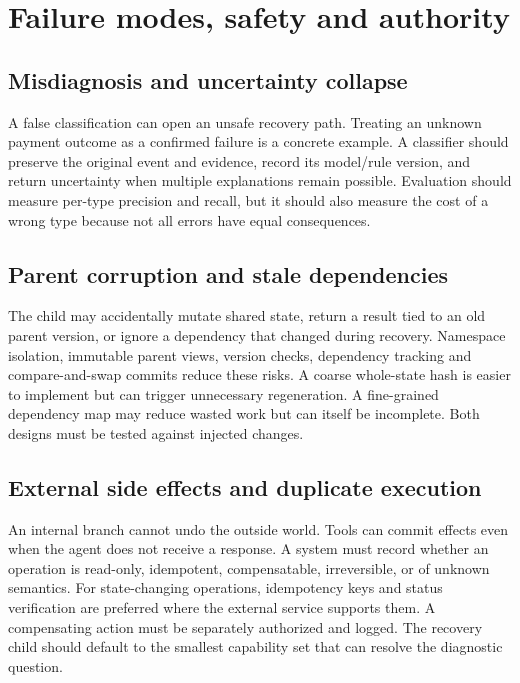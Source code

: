 \section{Failure modes, safety and authority}
\label{sec:ch13-safety}

\subsection{Misdiagnosis and uncertainty collapse}

A false classification can open an unsafe recovery path. Treating an unknown payment outcome as a confirmed failure is a concrete example. A classifier should preserve the original event and evidence, record its model/rule version, and return uncertainty when multiple explanations remain possible. Evaluation should measure per-type precision and recall, but it should also measure the cost of a wrong type because not all errors have equal consequences.

\subsection{Parent corruption and stale dependencies}

The child may accidentally mutate shared state, return a result tied to an old parent version, or ignore a dependency that changed during recovery. Namespace isolation, immutable parent views, version checks, dependency tracking and compare-and-swap commits reduce these risks. A coarse whole-state hash is easier to implement but can trigger unnecessary regeneration. A fine-grained dependency map may reduce wasted work but can itself be incomplete. Both designs must be tested against injected changes.

\subsection{External side effects and duplicate execution}

An internal branch cannot undo the outside world. Tools can commit effects even when the agent does not receive a response. A system must record whether an operation is read-only, idempotent, compensatable, irreversible, or of unknown semantics. For state-changing operations, idempotency keys and status verification are preferred where the external service supports them. A compensating action must be separately authorized and logged. The recovery child should default to the smallest capability set that can resolve the diagnostic question.

